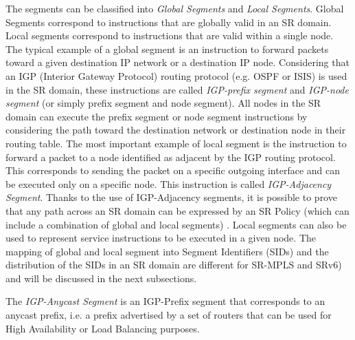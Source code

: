 The segments can be classified into \textit{Global Segments} and \textit{Local Segments}. Global Segments correspond to instructions that are globally valid in an SR domain. Local segments correspond to instructions that are valid within a single node. The typical example of a global segment is an instruction to forward packets toward a given destination IP network or a destination IP node. Considering that an IGP (Interior Gateway Protocol) routing protocol (e.g. OSPF or ISIS) is used in the SR domain, these instructions are called \textit{IGP-prefix segment} and \textit{IGP-node segment} (or simply prefix segment and node segment). All nodes in the SR domain can execute the prefix segment or node segment instructions by considering the path toward the destination network or destination node in their routing table. The most important example of local segment is the instruction to forward a packet to a node identified as adjacent by the IGP routing protocol. This corresponds to sending the packet on a specific outgoing interface and can be executed only on a specific node. This instruction is called \textit{IGP-Adjacency Segment}. Thanks to the use of IGP-Adjacency segments, it is possible to prove that any path across an SR domain can be expressed by an SR Policy (which can include a combination of global and local segments) \cite{pmsr}. Local segments can also be used to represent service instructions to be executed in a given node. The mapping of global and local segment into Segment Identifiers (SIDs) and the distribution of the SIDs in an SR domain are different for SR-MPLS and SRv6) and will be discussed in the next subsections.

The \textit{IGP-Anycast Segment} is an IGP-Prefix segment that corresponds to an anycast prefix, i.e. a prefix advertised by a set of routers that can be used for High Availability or Load Balancing purposes. 



